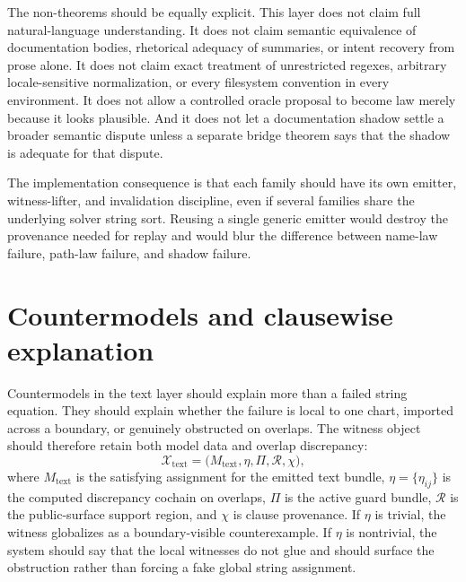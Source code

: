 \documentclass[11pt]{report}
\begin{document}
The non-theorems should be equally explicit. This layer does not claim full natural-language understanding. It does not claim semantic equivalence of documentation bodies, rhetorical adequacy of summaries, or intent recovery from prose alone. It does not claim exact treatment of unrestricted regexes, arbitrary locale-sensitive normalization, or every filesystem convention in every environment. It does not allow a controlled oracle proposal to become law merely because it looks plausible. And it does not let a documentation shadow settle a broader semantic dispute unless a separate bridge theorem says that the shadow is adequate for that dispute.

The implementation consequence is that each family should have its own emitter, witness-lifter, and invalidation discipline, even if several families share the underlying solver string sort. Reusing a single generic emitter would destroy the provenance needed for replay and would blur the difference between name-law failure, path-law failure, and shadow failure.

\section{Countermodels and clausewise explanation}
Countermodels in the text layer should explain more than a failed string equation. They should explain whether the failure is local to one chart, imported across a boundary, or genuinely obstructed on overlaps. The witness object should therefore retain both model data and overlap discrepancy:
\[
\mathcal{X}_{\mathrm{text}}
=
\bigl(
M_{\mathrm{text}},
\eta,
\Pi,
\mathcal{R},
\chi
\bigr),
\]
where $M_{\mathrm{text}}$ is the satisfying assignment for the emitted text bundle, $\eta=\{\eta_{ij}\}$ is the computed discrepancy cochain on overlaps, $\Pi$ is the active guard bundle, $\mathcal{R}$ is the public-surface support region, and $\chi$ is clause provenance. If $\eta$ is trivial, the witness globalizes as a boundary-visible counterexample. If $\eta$ is nontrivial, the system should say that the local witnesses do not glue and should surface the obstruction rather than forcing a fake global string assignment.
\end{document}
